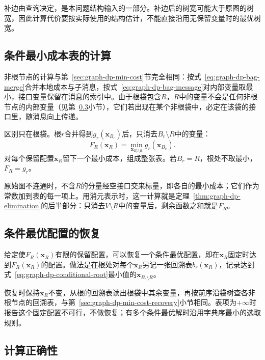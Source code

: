 补边由查询决定，是本问题结构输入的一部分。补边后的树宽可能大于原图的树宽，因此计算代价要按实际使用的结构估计，不能直接沿用无保留变量时的最优树宽。

\subsection{条件最小成本表的计算}
\label{sec:graph-dp-conditional-computation}

非根节点的计算与第~\ref{sec:graph-dp-min-cost}节完全相同：按式~\eqref{eq:graph-dp-bag-merge}合并本地成本与子消息，按式~\eqref{eq:graph-dp-bag-message}对内部变量取最小，接口变量保留在消息的索引中。由于根袋包含$R$，$R$中的变量不会是任何非根节点的内部变量（见第~\ref{sec:graph-dp-conditional-correctness}小节），它们若出现在某个非根袋中，必定在该袋的接口里，随消息向上传递。

区别只在根袋。根$r$合并得到$g_r(\bm x_{B_r})$后，只消去$B_r\setminus R$中的变量：
\begin{equation}
F_R(\bm x_R)=\min_{\bm x_{B_r\setminus R}}g_r(\bm x_{B_r}).
\label{eq:graph-dp-conditional-root}
\end{equation}
对每个保留配置$\bm x_R$留下一个最小成本，组成整张表。若$B_r=R$，根处不取最小，$F_R=g_r$。

原始图不连通时，不含$R$的分量经空接口交来标量，即各自的最小成本；它们作为常数加到表的每一项上。用消元表示时，这一计算就是定理~\ref{thm:graph-dp-elimination}的后半部分：只消去$V\setminus R$中的变量后，剩余函数之和就是$F_R$。

\subsection{条件最优配置的恢复}
\label{sec:graph-dp-conditional-recovery}

给定使$F_R(\bm x_R)$有限的保留配置，可以恢复一个条件最优配置，即在$\bm x_R$固定时达到$F_R(\bm x_R)$的配置。做法是在根处对每个$\bm x_R$另记一张回溯表$b_r(\bm x_R)$，记录达到式~\eqref{eq:graph-dp-conditional-root}最小值的$\bm x_{B_r\setminus R}$。

恢复时保持$\bm x_R$不变，从根的回溯表读出根袋中其余变量，再按前序沿袋树查各非根节点的回溯表，与第~\ref{sec:graph-dp-min-cost-recovery}小节相同。表项为$+\infty$时报告这个固定配置不可行，不做恢复；有多个条件最优解时沿用字典序最小的选取规则。

\subsection{计算正确性}
\label{sec:graph-dp-conditional-correctness}

